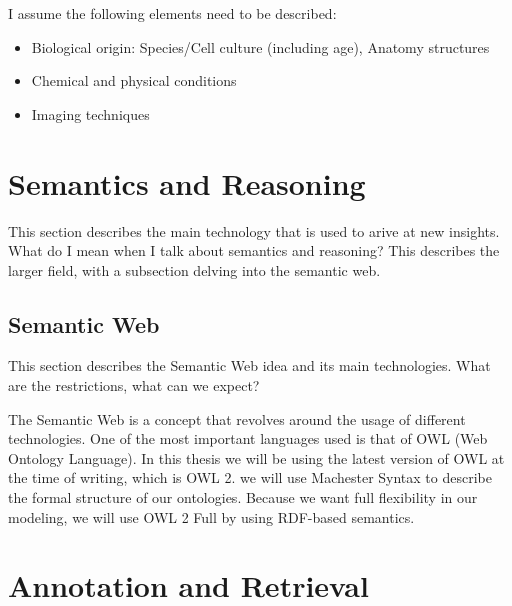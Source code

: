 I assume the following elements need to be described:
\begin{itemize}
\item Biological origin: Species/Cell culture (including age), Anatomy
  structures
\item Chemical and physical conditions
\item Imaging techniques
\end{itemize}


\section{Semantics and Reasoning}

This section describes the main technology that is used to arive at
new insights. What do I mean when I talk about semantics and
reasoning? This describes the larger field, with a subsection delving
into the semantic web.


\subsection{Semantic Web}

This section describes the Semantic Web idea and its main
technologies. What are the restrictions, what can we expect?

The Semantic Web is a concept that revolves around the usage of
different technologies. One of the most important languages used is
that of OWL (Web Ontology Language). In this thesis we will be using
the latest version of OWL at the time of writing, which is OWL 2. we
will use Machester Syntax to describe the formal structure of our
ontologies. Because we want full flexibility in our modeling, we will
use OWL 2 Full by using RDF-based semantics.




\section{Annotation and Retrieval}

